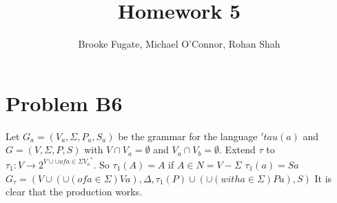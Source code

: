 \documentclass[12pt]{article}
\begin{document}
\pagestyle{plain}
\titleformat{\subsection}[runin]
  {\normalfont\large\bfseries}{\thesubsection}{1em}{}

\title{Homework 5}
\author{Brooke Fugate, Michael O'Connor, Rohan Shah}
\date{}

\maketitle

\section*{Problem B6}

Let $G_a = (V_a, \Sigma , P_a , S_a )$ be the grammar for the language $'tau(a)$ and $G=(V, \Sigma , P, S)$ with $V \cap V_a = \emptyset$ and $V_a \cap V_b = \emptyset$. Extend $\tau$ to $\tau_1: V \rightarrow 2^{{V \cup \cup of a \in \Sigma V_a}^*}$. So $\tau_1(A) = A$ if $A \in N = V- \Sigma$ \newline
$\tau_1(a) = Sa$ \newline
$G_{\tau} = (V \cup (\cup (of a \in \Sigma) Va), \Delta, \tau_1(P) \cup (\cup (with a \in \Sigma) Pa), S)$  
It is clear that the production works.
\end{document}
